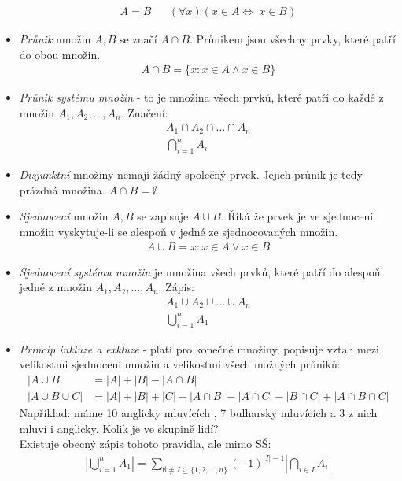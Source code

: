 \documentclass[12pt]{article}
\begin{document}
\begin{itemize}
\begin{align}
A = B && (\forall x)(x \in A \iff \ x \in B)
\end{align}
\item \emph{Průnik} množin $A,B$ se značí $A \cap B$. Průnikem jsou všechny prvky, které patří do obou množin.
\begin{align}
A \cap B = \{ x: x \in A \land x \in B\}
\end{align}
\item \emph{Průnik systému množin} - to je množina všech prvků, které patří do každé z množin $A_1, A_2, \dotsc , A_n$. Značení:
\begin{align}
A_1 \cap A_2 \cap \dotso \cap A_n \\
\bigcap_{i=1}^n A_i
\end{align}
\item \emph{Disjunktní} množiny nemají žádný společný prvek. Jejich průnik je tedy prázdná množina. $ A \cap B = \emptyset$
\item \emph{Sjednocení} množin $A,B$ se zapisuje $A \cup B$. Říká že prvek je ve sjednocení množin vyskytuje-li se alespoň v jedné ze sjednocovaných množin.
\begin{align}
A \cup B = {x: x \in A \lor x \in B}
\end{align}
\item \emph{Sjednocení systému množin} je množina všech prvků, které patří do alespoň jedné z množin $A_1, A_2, \dotsc , A_n$. Zápis:
\begin{align}
A_1 \cup A_2 \cup \dotso \cup  A_n \\
\bigcup_{i=1}^{n} A_1
\end{align}
\item \emph{Princip inkluze a exkluze} - platí pro konečné množiny, popisuje vztah mezi velikostmi sjednocení množin a velikostmi všech možných průniků:
\begin{align}
|A \cup B| &= |A| + |B| - |A \cap B| \\
|A \cup B \cup C| &= |A| + |B| + |C| - |A \cap B| - |A \cap C| - |B \cap C| + |A \cap B \cap C|
\end{align}
Například: máme 10 anglicky mluvících , 7 bulharsky mluvících a 3 z nich mluví i anglicky. Kolik je ve skupině lidí?\\
Existuje obecný zápis tohoto pravidla, ale mimo SŠ:
\begin{align}
\left| \bigcup_{i=1}^n A_1  \right| = \sum_{\emptyset \neq I \subseteq \{ 1,2, \dotsc , n\} } \left(-1 \right)^{|I|-1} \left| \bigcap_{i \in I} A_i \right|

\end{align}
\end{itemize}
\end{document}
